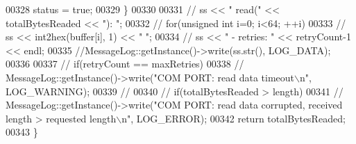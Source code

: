 \begin{DoxyCode}
00328             status = \textcolor{keyword}{true};
00329     \}
00330 
00331 \textcolor{comment}{//    ss << " read(" << totalBytesReaded << "): ";}
00332 \textcolor{comment}{//    for(unsigned int i=0; i<64; ++i)}
00333 \textcolor{comment}{//        ss << int2hex(buffer[i], 1) << " ";}
00334 \textcolor{comment}{//    ss <<  " - retries: " << retryCount-1 << endl;}
00335     \textcolor{comment}{//MessageLog::getInstance()->write(ss.str(), LOG\_DATA);}
00336 
00337 \textcolor{comment}{//  if(retryCount == maxRetries)}
00338 \textcolor{comment}{//        MessageLog::getInstance()->write("COM PORT: read data timeout\(\backslash\)n", LOG\_WARNING);}
00339 \textcolor{comment}{//}
00340 \textcolor{comment}{//    if(totalBytesReaded > length)}
00341 \textcolor{comment}{//        MessageLog::getInstance()->write("COM PORT: read data corrupted, received length > requested
       length\(\backslash\)n", LOG\_ERROR);}
00342     \textcolor{keywordflow}{return} totalBytesReaded;
00343 \}
\end{DoxyCode}
